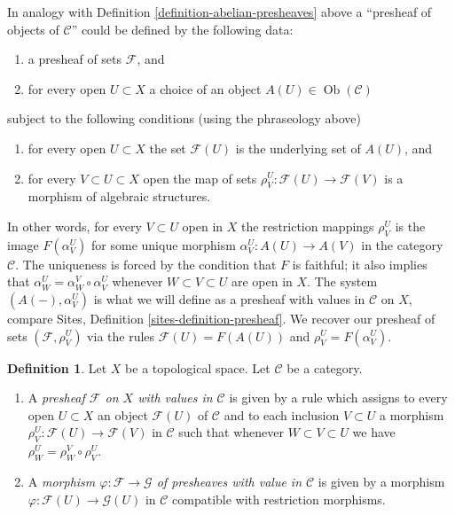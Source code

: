 \documentclass{stacks-project}
\theoremstyle{plain}
\theoremstyle{definition}
\newtheorem{definition}[subsection]{Definition}
\theoremstyle{remark}
\numberwithin{equation}{subsection}
\def\Ob{\mathop{\mathrm{Ob}}\nolimits}
\begin{document}
\medskip\noindent
In analogy with Definition \ref{definition-abelian-presheaves}
above a ``presheaf of objects of $\mathcal{C}$'' could be
defined by the following data:
\begin{enumerate}
\item a presheaf of sets $\mathcal{F}$, and
\item for every open $U \subset X$ a choice
of an object $A(U) \in \Ob(\mathcal{C})$
\end{enumerate}
subject to the following conditions (using the phraseology above)
\begin{enumerate}
\item for every open $U \subset X$ the set $\mathcal{F}(U)$
is the underlying set of $A(U)$, and
\item for every $V \subset U \subset X$ open
the map of sets $\rho_V^U: \mathcal{F}(U) \to \mathcal{F}(V)$
is a morphism of algebraic structures.
\end{enumerate}
In other words, for every $V \subset U$ open in $X$
the restriction mappings $\rho^U_V$ is the image
$F(\alpha^U_V)$ for some unique morphism
$\alpha^U_V : A(U) \to A(V)$ in the category $\mathcal{C}$.
The uniqueness is forced by the condition that $F$ is
faithful; it also implies that
$\alpha^U_W = \alpha^V_W \circ \alpha^U_V$
whenever $W \subset V \subset U$ are open in $X$.
The system $(A(-), \alpha^U_V)$ is what we will define as a
presheaf with values in $\mathcal{C}$ on $X$, compare
Sites, Definition \ref{sites-definition-presheaf}.
We recover our presheaf of sets $(\mathcal{F}, \rho_V^U)$
via the rules $\mathcal{F}(U) = F(A(U))$ and
$\rho_V^U = F(\alpha_V^U)$.

\begin{definition}
\label{definition-presheaf-values-in-category}
Let $X$ be a topological space.
Let $\mathcal{C}$ be a category.
\begin{enumerate}
\item A {\it presheaf $\mathcal{F}$ on $X$ with values in $\mathcal{C}$}
is given by a rule which assigns to every open $U \subset X$
an object $\mathcal{F}(U)$ of $\mathcal{C}$
and to each inclusion $V \subset U$
a morphism $\rho_V^U : \mathcal{F}(U) \to \mathcal{F}(V)$
in $\mathcal{C}$ such that whenever $W \subset V \subset U$
we have $\rho_W^U = \rho_W^V \circ \rho_V^U$.
\item A {\it morphism $\varphi : \mathcal{F} \to \mathcal{G}$
of presheaves with value in $\mathcal{C}$} is given by a
morphism $\varphi : \mathcal{F}(U) \to \mathcal{G}(U)$
in $\mathcal{C}$ compatible with restriction morphisms.
\end{enumerate}
\end{definition}
\end{document}
